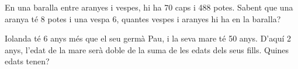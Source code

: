 \begin{activitats}
\begin{mylist}
\columnbreak

\exer  En una baralla entre aranyes i vespes, hi ha 70 caps i 488 potes. Sabent que una aranya té 8 potes i una vespa 6, quantes vespes i aranyes hi ha en la baralla?

\exer  Iolanda té 6 anys més que el seu germà Pau, i la seva mare té 50 anys. D'aquí 2 anys, l'edat de la mare serà doble de la suma de les edats dels seus fills. Quines edats tenen?

\end{mylist}
\end{activitats}

 
 
